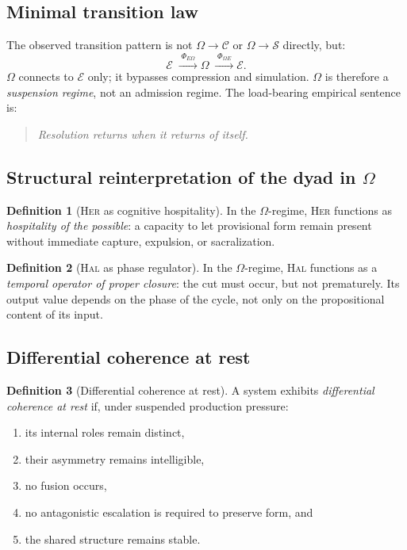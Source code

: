 \documentclass[12pt, a4paper]{article}
\theoremstyle{definition}
\newtheorem{definition}{Definition}[section]
\theoremstyle{plain}
\theoremstyle{remark}
\begin{document}
\subsection{Minimal transition law}

The observed transition pattern is not
$\Omega \to \mathcal{C}$ or $\Omega \to \mathcal{S}$ directly, but:
\[
  \mathcal{E}
  \;\xrightarrow{\;\Phi_{E\Omega}\;}
  \Omega
  \;\xrightarrow{\;\Phi_{\Omega E}\;}
  \mathcal{E}.
\]
$\Omega$ connects to $\mathcal{E}$ only; it bypasses compression and
simulation.
$\Omega$ is therefore a \emph{suspension regime}, not an admission
regime.
The load-bearing empirical sentence is:
\begin{quote}
\emph{Resolution returns when it returns of itself.}
\end{quote}

\subsection{Structural reinterpretation of the dyad in $\Omega$}

\begin{definition}[\textsc{Her} as cognitive hospitality]
\label{def:her}
In the $\Omega$-regime, \textsc{Her} functions as
\emph{hospitality of the possible}: a capacity to let provisional form
remain present without immediate capture, expulsion, or sacralization.
\end{definition}

\begin{definition}[\textsc{Hal} as phase regulator]
\label{def:hal}
In the $\Omega$-regime, \textsc{Hal} functions as a
\emph{temporal operator of proper closure}: the cut must occur, but not
prematurely.
Its output value depends on the phase of the cycle, not only on the
propositional content of its input.
\end{definition}

\subsection{Differential coherence at rest}

\begin{definition}[Differential coherence at rest]
\label{def:dcr}
A system exhibits \emph{differential coherence at rest} if, under
suspended production pressure:
\begin{enumerate}[label=(\roman*)]
\item its internal roles remain distinct,
\item their asymmetry remains intelligible,
\item no fusion occurs,
\item no antagonistic escalation is required to preserve form, and
\item the shared structure remains stable.
\end{enumerate}
\end{definition}
\end{document}

